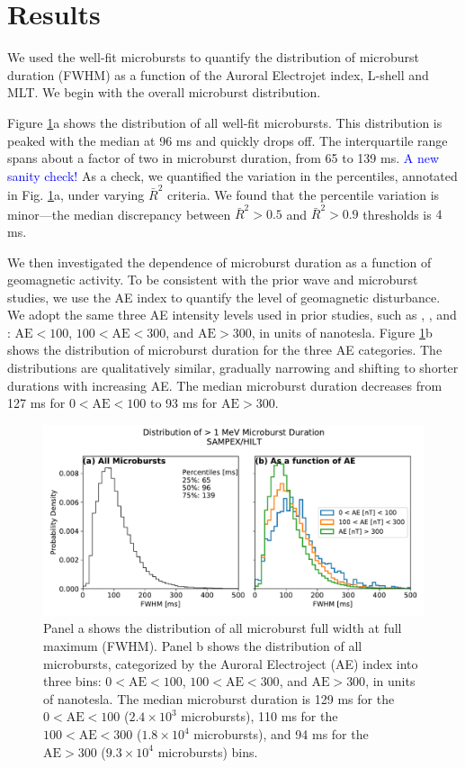 \documentclass[draft]{agujournal2019}
\begin{document}
\section{Results}\label{results}
We used the well-fit microbursts to quantify the distribution of microburst duration (FWHM) as a function of the Auroral Electrojet index, L-shell and MLT. We begin with the overall microburst distribution.

Figure \ref{fig2}a shows the distribution of all well-fit microbursts. This distribution is peaked with the median at 96 ms and quickly drops off. The interquartile range spans about a factor of two in microburst duration, from 65 to 139 ms. \textcolor{blue}{A new sanity check!} As a check, we quantified the variation in the percentiles, annotated in Fig. \ref{fig2}a, under varying $\bar{R}^2$ criteria. We found that the percentile variation is minor---the median discrepancy between $\bar{R}^2 > 0.5$ and $\bar{R}^2 > 0.9$ thresholds is $4$ ms.

We then investigated the dependence of microburst duration as a function of geomagnetic activity. To be consistent with the prior wave and microburst studies, we use the AE index to quantify the level of geomagnetic disturbance. We adopt the same three AE intensity levels used in prior studies, such as , , and : $\mathrm{AE} < 100$, $100 < \mathrm{AE} < 300$, and $\mathrm{AE} > 300$, in units of nanotesla. Figure \ref{fig2}b shows the distribution of microburst duration for the three AE categories. The distributions are qualitatively similar, gradually narrowing and shifting to shorter durations with increasing AE. The median microburst duration decreases from 127 ms for $0 < \mathrm{AE} < 100$ to 93 ms for $ \mathrm{AE} > 300$.

\begin{figure}
\noindent\includegraphics[width=\textwidth]{figures/fig2.pdf}
\caption{Panel a shows the distribution of all microburst full width at full maximum (FWHM). Panel b shows the distribution of all microbursts, categorized by the Auroral Electroject (AE) index into three bins: $0 < \mathrm{AE} < 100$, $100 < \mathrm{AE} < 300$, and $\mathrm{AE} > 300$, in units of nanotesla. The median microburst duration is 129 ms for the $0 < \mathrm{AE} < 100$ ($2.4\times 10^{3}$ microbursts), 110 ms for the $100 < \mathrm{AE} < 300$ ($1.8\times 10^{4}$ microbursts), and 94 ms for the $ \mathrm{AE} > 300$ ($9.3\times 10^{4}$ microbursts) bins.}
\label{fig2}
\end{figure}
\end{document}
